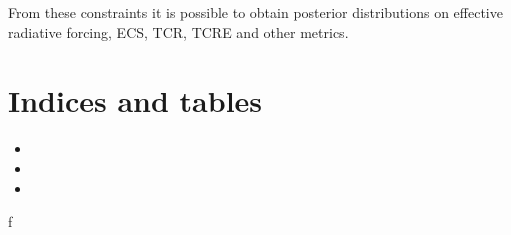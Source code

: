 \documentclass[letterpaper,10pt,english]{sphinxmanual}
\begin{document}
From these constraints it is possible to obtain posterior distributions
on effective radiative forcing, ECS, TCR, TCRE and other metrics.
\label{\detokenize{index:module-fair}}

\chapter{Indices and tables}
\label{\detokenize{index:indices-and-tables}}\begin{itemize}
\item {} 

\item {} 

\item {} 

\end{itemize}


\renewcommand{\indexname}{Python Module Index}
\begin{sphinxtheindex}
\def\bigletter#1{{\Large\sffamily#1}\nopagebreak\vspace{1mm}}
\bigletter{f}
\item {}
\end{sphinxtheindex}

\renewcommand{\indexname}{Index}
\printindex
\end{document}
